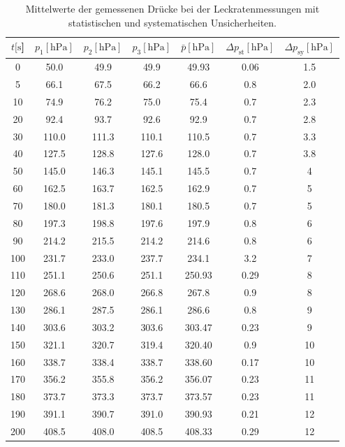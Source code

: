 %
\begin{table}[H]
  \centering
    \caption{Mittelwerte der gemessenen Drücke bei der Leckratenmessungen mit statistischen und systematischen Unsicherheiten.}
    \label{tab:Dreh_Leck3}
    \begin{tabular}{
      S[table-format=3.0] 
      S[table-format=3.1] S[table-format=3.1] S[table-format=3.1]
      S[table-format=3.2] S[table-format=1.2] S[table-format=2.1]
      }
      \toprule
      {$t [\si{\second}$]} &
      {$p_1 [\si{\hecto\pascal}]$} & {$p_2 [\si{\hecto\pascal}]$} & {$p_3 [\si{\hecto\pascal}]$} &
      {$\bar{p} [\si{\hecto\pascal}]$} & {$\Delta p_\text{st} [\si{\hecto\pascal}]$} & {$\Delta p_\text{sy} [\si{\hecto\pascal}]$}\\
         & 50.0  & 49.9  & 49.9  & 49.93  & 0.06  & 1.5  \\
      5   & 66.1  & 67.5  & 66.2  & 66.6   & 0.8   & 2.0  \\
      10  & 74.9  & 76.2  & 75.0  & 75.4   & 0.7   & 2.3  \\
      20  & 92.4  & 93.7  & 92.6  & 92.9   & 0.7   & 2.8  \\
      30  & 110.0 & 111.3 & 110.1 & 110.5  & 0.7   & 3.3  \\
      40  & 127.5 & 128.8 & 127.6 & 128.0  & 0.7   & 3.8  \\
      50  & 145.0 & 146.3 & 145.1 & 145.5  & 0.7   & 4    \\
      60  & 162.5 & 163.7 & 162.5 & 162.9  & 0.7   & 5    \\
      70  & 180.0 & 181.3 & 180.1 & 180.5  & 0.7   & 5    \\
      80  & 197.3 & 198.8 & 197.6 & 197.9  & 0.8   & 6    \\
      90  & 214.2 & 215.5 & 214.2 & 214.6  & 0.8   & 6    \\
      100 & 231.7 & 233.0 & 237.7 & 234.1  & 3.2   & 7    \\
      110 & 251.1 & 250.6 & 251.1 & 250.93 & 0.29  & 8    \\
      120 & 268.6 & 268.0 & 266.8 & 267.8  & 0.9   & 8    \\
      130 & 286.1 & 287.5 & 286.1 & 286.6  & 0.8   & 9    \\
      140 & 303.6 & 303.2 & 303.6 & 303.47 & 0.23  & 9    \\
      150 & 321.1 & 320.7 & 319.4 & 320.40 & 0.9   & 10   \\
      160 & 338.7 & 338.4 & 338.7 & 338.60 & 0.17  & 10   \\
      170 & 356.2 & 355.8 & 356.2 & 356.07 & 0.23  & 11   \\
      180 & 373.7 & 373.3 & 373.7 & 373.57 & 0.23  & 11   \\
      190 & 391.1 & 390.7 & 391.0 & 390.93 & 0.21  & 12   \\
      200 & 408.5 & 408.0 & 408.5 & 408.33 & 0.29  & 12   \\
      \bottomrule
    \end{tabular}
\end{table}

